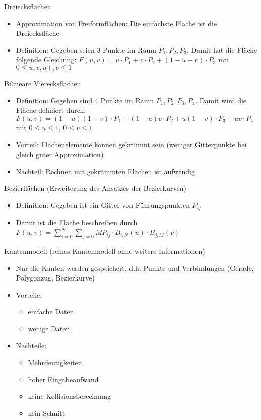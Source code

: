 \documentclass[paper=a4, fontsize=11pt]{scrartcl} %
\numberwithin{equation}{section} %
\numberwithin{figure}{section} %
\numberwithin{table}{section} %
\begin{document}
Dreiecksflächen
\begin{itemize}
\item Approximation von Freiformflächen: Die einfachste Fläche ist die Dreiecksfläche.
\item Definition: Gegeben seien 3 Punkte im Raum $P_1,P_2,P_3$. Damit hat die Fläche folgende Gleichung: $F(u,v) = u \cdot P_1 + v \cdot P_2 + (1-u-v) \cdot P_3$ mit $0 \le u,v,u+,v \le 1$
\end{itemize}

Bilineare Vierecksflächen
\begin{itemize}
\item Definition: Gegeben sind 4 Punkte im Raum $P_1,P_2,P_3,P_4$. Damit wird die Fläche definiert durch: $F(u,v) = (1-u)(1-v) \cdot P_1 + (1-u)v \cdot P_2 + u(1-v) \cdot P_3 + uv \cdot P_4$ mit $0 \le u \le 1$, $0 \le v \le 1$
\item Vorteil: Flächenelemente können gekrümmt sein (weniger Gitterpunkte bei gleich guter Approximation)
\item Nachteil: Rechnen mit gekrümmten Flächen ist aufwendig
\end{itemize}

Bezierflächen (Erweiterung des Ansatzes der Bezierkurven)
\begin{itemize}
\item Definition: Gegeben ist ein Gitter von Führungspunkten $P_{ij}$
\item Damit ist die Fläche beschreiben durch $F(u,v) = \sum\limits_{i=0}^N \sum\limits_{j=0}{M} P_{ij} \cdot B_{i,N}(u) \cdot B_{j,M}(v)$
\end{itemize}

Kantenmodell (reines Kantenmodell ohne weitere Informationen)
\begin{itemize}
\item Nur die Kanten werden gespeichert, d.h. Punkte und Verbindungen (Gerade, Polygonzug, Bezierkurve)
\item Vorteile:
\begin{itemize}
\item einfache Daten
\item wenige Daten
\end{itemize}
\item Nachteile:
\begin{itemize}
\item Mehrdeutigkeiten
\item hoher Eingabeaufwand
\item keine Kollisionsberechnung
\item kein Schnitt
\end{itemize}
\end{itemize}
\end{document}
